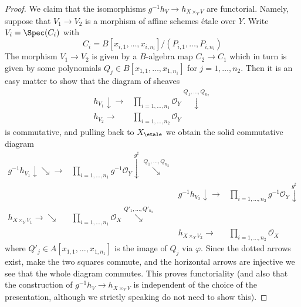 \begin{proof}
\medskip\noindent
We claim that the isomorphisms $g^{-1}h_V \to h_{X \times_Y V}$ are
functorial. Namely, suppose that $V_1 \to V_2$ is a morphism of affine
schemes \'etale over $Y$. Write
$V_i = \Spec(C_i)$ with
$$
C_i = B[x_{i, 1}, \ldots, x_{i, n_i}]/(P_{i, 1}, \ldots, P_{i, n_i})
$$
The morphism $V_1 \to V_2$ is given by a $B$-algebra map $C_2 \to C_1$
which in turn is given by some polynomials
$Q_j \in B[x_{1, 1}, \ldots, x_{1, n_1}]$ for $j = 1, \ldots, n_2$.
Then it is an easy matter to show that the diagram of sheaves
$$
\begin{array}{cc}h_{V_1} \downarrow\longrightarrow & \prod_{i = 1, \ldots, n_1} \mathcal{O}_Y
\overset{Q_1, \ldots, Q_{n_2}}{\downarrow} \\ h_{V_2} \longrightarrow & \prod_{i = 1, \ldots, n_2} \mathcal{O}_Y\end{array}
$$
is commutative, and pulling back to $X_\etale$ we obtain the
solid commutative diagram
$$
\begin{array}{cccc}g^{-1}h_{V_1} \downarrow\searrow\longrightarrow & \prod_{i = 1, \ldots, n_1} g^{-1}\mathcal{O}_Y
\overset{g^\sharp}{\downarrow}\overset{Q_1, \ldots, Q_{n_2}}{\searrow} &  &  \\  &  & g^{-1}h_{V_2} \downarrow\longrightarrow & \prod_{i = 1, \ldots, n_2} g^{-1}\mathcal{O}_Y
\overset{g^\sharp}{\downarrow} \\ h_{X \times_Y V_1} \longrightarrow\searrow & \prod\nolimits_{i = 1, \ldots, n_1} \mathcal{O}_X
\overset{Q'_1, \ldots, Q'_{n_2}}{\searrow} &  &  \\  &  & h_{X \times_Y V_2} \longrightarrow & \prod\nolimits_{i = 1, \ldots, n_2} \mathcal{O}_X\end{array}
$$
where $Q'_j \in A[x_{1, 1}, \ldots, x_{1, n_1}]$ is the image of
$Q_j$ via $\varphi$. Since the dotted arrows exist, make the
two squares commute, and the horizontal arrows are injective
we see that the whole diagram commutes. This proves functoriality
(and also that the construction of $g^{-1}h_V \to h_{X \times_Y V}$
is independent of the choice of the presentation, although we
strictly speaking do not need to show this).


\end{proof}
